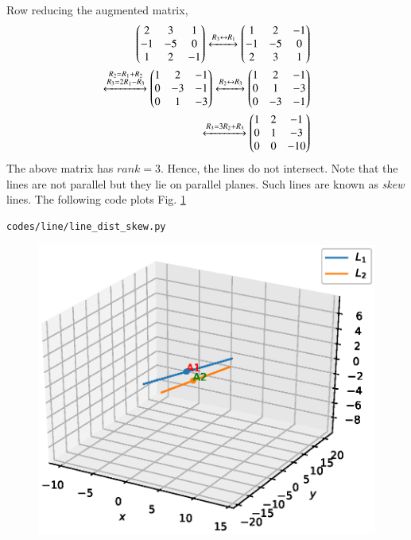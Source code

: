 \begin{enumerate}[label=\arabic*.,ref=\thesubsection.\theenumi]
\begin{align}
\end{align}
%
Row reducing the augmented matrix,
%
\begin{align}
\begin{pmatrix}
2 & 3 & 1 
\\
-1 & -5 & 0
\\
1 & 2 & -1
\end{pmatrix}
\xleftrightarrow[]{R_3\leftrightarrow R_1}
\begin{pmatrix}
1 & 2 & -1
\\
-1 & -5 & 0
\\
2 & 3 & 1 
\end{pmatrix}
\\
\xleftrightarrow[]{\substack{R_2= R_1+R_2\\R_3 = 2R_1-R_3}}
\begin{pmatrix}
1 & 2 & -1
\\
0 & -3 & -1
\\
0 & 1 & -3 
\end{pmatrix}
\xleftrightarrow[]{R_2\leftrightarrow R_3}
\begin{pmatrix}
1 & 2 & -1
\\
0 & 1 & -3 
\\
0 & -3 & -1
\end{pmatrix}
\\
\xleftrightarrow[]{R_3=3R_2+R_3}
\begin{pmatrix}
1 & 2 & -1
\\
0 & 1 & -3 
\\
0 & 0 & -10
\end{pmatrix}
\end{align}
%
The above matrix has $rank = 3$.  Hence, the lines do not intersect.  Note that the lines are not parallel but they  lie on parallel planes.  Such lines are known as {\em skew} lines.  
The following code plots 
Fig. \ref{fig:line_dist_skew} 
%
\begin{lstlisting}
codes/line/line_dist_skew.py
\end{lstlisting}
%
\begin{figure}[!ht]
\includegraphics[width=\columnwidth]{./line/figs/line_dist_skew.eps}
\caption{}
\label{fig:line_dist_skew}
\end{figure}
%


\end{enumerate}
